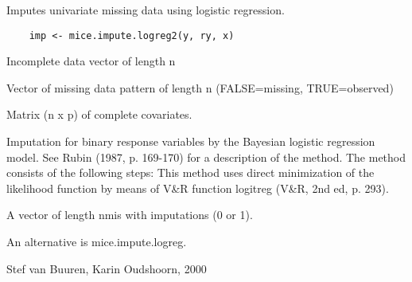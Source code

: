 \begin{Description}\relax
Imputes univariate missing data using logistic regression.
\end{Description}
\begin{Usage}
\begin{verbatim}
    imp <- mice.impute.logreg2(y, ry, x)
\end{verbatim}
\end{Usage}
\begin{Arguments}
\begin{ldescription}
\item[\code{y}] Incomplete data vector of length n
\item[\code{ry}] Vector of missing data pattern of length n (FALSE=missing,
TRUE=observed)
\item[\code{x}] Matrix (n x p) of complete covariates.

\end{ldescription}
\end{Arguments}
\begin{Details}\relax
Imputation for binary response variables by the Bayesian 
logistic regression model. See Rubin (1987, p. 169-170) for
a description of the method.
The method consists of the following steps:
This method uses direct minimization of the likelihood function
by means of V\&R function logitreg (V\&R, 2nd ed, p. 293).
\end{Details}
\begin{Value}
\begin{ldescription}
\item[\code{imp}] A vector of length nmis with imputations (0 or 1).
\end{ldescription}
\end{Value}
\begin{Note}\relax
An alternative is mice.impute.logreg.
\end{Note}
\begin{Author}\relax
Stef van Buuren, Karin Oudshoorn, 2000
\end{Author}
